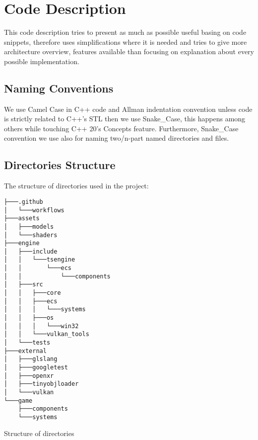 \newpage
\section{Code Description}
\label{sec:code_descr}
This code description tries to present as much as possible useful basing on code snippets, therefore uses simplifications where it is needed and tries to give more architecture overview, features available than focusing on explanation about every possible implementation.
\subsection{Naming Conventions}
We use Camel Case in C++ code and Allman indentation convention unless code is strictly related to C++'s STL then we use Snake\_Case, this happens among others while touching C++ 20's Concepts feature.
Furthermore, Snake\_Case convention we use also for naming two/n-part named directories and files.

\newpage
\subsection{Directories Structure}
The structure of directories used in the project:
\begin{verbatim}
├───.github
│   └───workflows
├───assets
│   ├───models
│   └───shaders
├───engine
│   ├───include
│   │   └───tsengine
│   │       └───ecs
│   │           └───components
│   ├───src
│   │   ├───core
│   │   ├───ecs
│   │   │   └───systems
│   │   ├───os
│   │   │   └───win32
│   │   └───vulkan_tools
│   └───tests
├───external
│   ├───glslang
│   ├───googletest
│   ├───openxr
│   ├───tinyobjloader
│   └───vulkan
└───game
    ├───components
    └───systems
\end{verbatim}
\begin{table}[h]
\caption{Structure of directories}
\end{table}

\newpage

